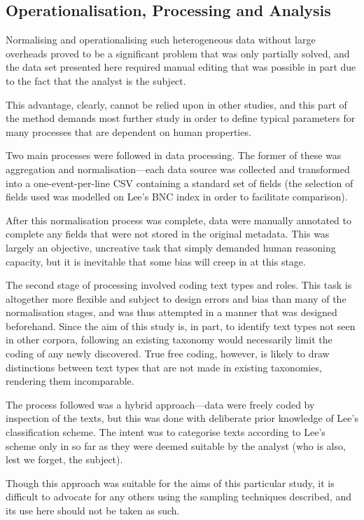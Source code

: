 \subsection{Operationalisation, Processing and Analysis}
\label{sec:personal:method:operationalisation}
Normalising and operationalising such heterogeneous data without large overheads proved to be a significant problem that was only partially solved, and the data set presented here required manual editing that was possible in part due to the fact that the analyst is the subject.

This advantage, clearly, cannot be relied upon in other studies, and this part of the method demands most further study in order to define typical parameters for many processes that are dependent on human properties.

Two main processes were followed in data processing.  The former of these was aggregation and normalisation---each data source was collected and transformed into a one-event-per-line CSV containing a standard set of fields (the selection of fields used was modelled on Lee's BNC index\cite{lee2001genres} in order to facilitate comparison).

After this normalisation process was complete, data were manually annotated to complete any fields that were not stored in the original metadata.  This was largely an objective, uncreative task that simply demanded human reasoning capacity, but it is inevitable that some bias will creep in at this stage.

The second stage of processing involved coding text types and roles.  This task is altogether more flexible and subject to design errors and bias than many of the normalisation stages, and was thus attempted in a manner that was designed beforehand.  Since the aim of this study is, in part, to identify text types not seen in other corpora, following an existing taxonomy would necessarily limit the coding of any newly discovered.  True free coding, however, is likely to draw distinctions between text types that are not made in existing taxonomies, rendering them incomparable.

The process followed was a hybrid approach---data were freely coded by inspection of the texts, but this was done with deliberate prior knowledge of Lee's classification scheme.  The intent was to categorise texts according to Lee's scheme only in so far as they were deemed suitable by the analyst (who is also, lest we forget, the subject).

Though this approach was suitable for the aims of this particular study, it is difficult to advocate for any others using the sampling techniques described, and its use here should not be taken as such.

